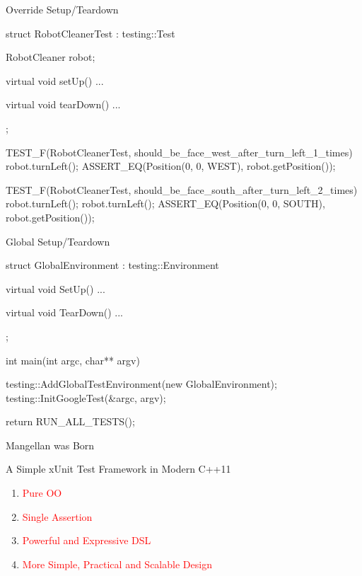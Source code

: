 \begin{frame}[fragile]{Override Setup/Teardown}
\begin{c++}
struct RobotCleanerTest : testing::Test
{
    RobotCleaner robot;

    virtual void setUp()
    { ... }

    virtual void tearDown()
    { ... }
};

TEST_F(RobotCleanerTest, should_be_face_west_after_turn_left_1_times)
{
    robot.turnLeft();
    ASSERT_EQ(Position(0, 0, WEST), robot.getPosition());
}

TEST_F(RobotCleanerTest, should_be_face_south_after_turn_left_2_times)
{
    robot.turnLeft();
    robot.turnLeft();
    ASSERT_EQ(Position(0, 0, SOUTH), robot.getPosition());
}
\end{c++}
\end{frame}

\begin{frame}[fragile]{Global Setup/Teardown}
\begin{c++}
struct GlobalEnvironment : testing::Environment
{
    virtual void SetUp()
    { ... }

    virtual void TearDown()
    { ... }
};

int main(int argc, char** argv)
{
    testing::AddGlobalTestEnvironment(new GlobalEnvironment);
    testing::InitGoogleTest(&argc, argv);

    return RUN_ALL_TESTS();
}
\end{c++}
\end{frame}

\begin{frame}[fragile]{Mangellan was Born}
\begin{block}{A Simple xUnit Test Framework in Modern C++11}
  \begin{enumerate}
    \item \textcolor{red}{Pure OO}
    \item \textcolor{red}{Single Assertion}
    \item \textcolor{red}{Powerful and Expressive DSL}
    \item \textcolor{red}{More Simple, Practical and Scalable Design}
  \end{enumerate}
\end{block}
\end{frame}